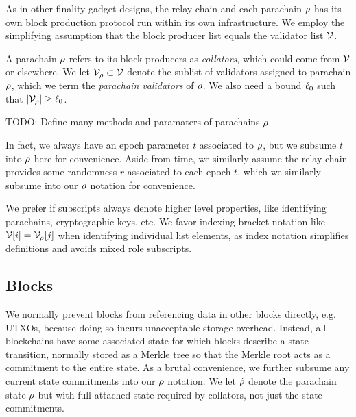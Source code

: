 As in other finality gadget designs, the relay chain and each parachain $\rho$ has its own block production protocol run within its own infrastructure.  We employ the simplifying assumption that the block producer list equals the validator list $\mathcal{V}$.  


A parachain $\rho$ refers to its block producers as {\em collators}, which could come from $\mathcal{V}$ or elsewhere.  We let $\mathcal{V}_{\rho} \subset \mathcal{V}$ denote the sublist of validators assigned to parachain $\rho$, which we term the {\em parachain validators} of $\rho$.  We also need a bound $\ell_0$ such that $|\mathcal{V}_{\rho}| \ge \ell_0$.

TODO: Define many methods and paramaters of parachains $\rho$

In fact, we always have an epoch parameter $t$ associated to $\rho$, but we subsume $t$ into $\rho$ here for convenience.  Aside from time, we similarly assume the relay chain provides some randomness $r$ associated to each epoch $t$, which we similarly subsume into our $\rho$ notation for convenience.

We prefer if subscripts always denote higher level properties, like identifying parachains, cryptographic keys, etc.  We favor indexing bracket notation like $\mathcal{V}[i] = \mathcal{V}_{\rho}[j]$ when identifying individual list elements, as index notation simplifies definitions and avoids mixed role subscripts. 

\subsection{Blocks}

We normally prevent blocks from referencing data in other blocks directly, e.g. UTXOs, because doing so incurs unacceptable storage overhead.  Instead, all blockchains have some associated state for which blocks describe a state transition, normally stored as a Merkle tree so that the Merkle root acts as a commitment to the entire state.  As a brutal convenience, we further subsume any current state commitments into our $\rho$ notation.  We let $\hat{\rho}$ denote the parachain state $\rho$ but with full attached state required by collators, not just the state commitments. 

